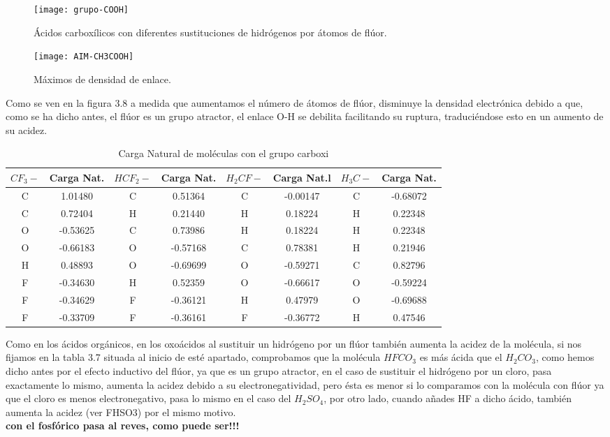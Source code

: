 \begin{figure}[H]
	\centering
	\texttt{[image: grupo-COOH]}
	\caption{Ácidos carboxílicos con diferentes sustituciones de hidrógenos por átomos de flúor.}
\end{figure}
\begin{figure}[H]
\centering
\texttt{[image: AIM-CH3COOH]}\cite{AIM}
\caption{Máximos de densidad de enlace.}
\end{figure}

Como se ven en la figura 3.8 a medida que aumentamos el número de átomos de flúor, disminuye la densidad electrónica debido a que, como se ha dicho antes, el flúor es un grupo atractor, el enlace O-H se debilita facilitando su ruptura, traduciéndose esto en un aumento de su acidez.
\begin{table}[H]
    \centering
    \begin{tabular}{|c|c|c|c|c|c|c|c|}
    \hline
    $CF_3-$ & Carga Nat. & $HCF_2-$ & Carga Nat. & $H_2CF-$ & Carga Nat.l  & $H_3C-$ & Carga Nat. \\ \hline
     C & 1.01480 &  C & 0.51364 & C & -0.00147 & C & -0.68072 \\ \hline
     C & 0.72404 &  H & 0.21440 & H & 0.18224 & H & 0.22348 \\ \hline
     O & -0.53625 & C & 0.73986 & H & 0.18224 & H & 0.22348 \\ \hline
     O & -0.66183 & O & -0.57168 & C & 0.78381 & H & 0.21946 \\ \hline
     H & 0.48893 & O & -0.69699 & O & -0.59271 & C & 0.82796 \\ \hline
     F & -0.34630 & H & 0.52359 & O & -0.66617 & O & -0.59224 \\ \hline
     F & -0.34629 & F & -0.36121 & H & 0.47979 & O & -0.69688 \\ \hline
     F & -0.33709 & F & -0.36161 & F & -0.36772 & H & 0.47546 \\ \hline
    \end{tabular}
    \caption{Carga Natural de moléculas con el grupo carboxi}
\end{table}

Como en los ácidos orgánicos, en los oxoácidos al sustituir un hidrógeno por un flúor también aumenta la acidez de la molécula, si nos fijamos en la tabla 3.7 situada al inicio de esté apartado, comprobamos que la molécula $HFCO_3$ es más ácida que el $H_2CO_3$, como hemos dicho antes por el efecto inductivo del flúor, ya que es un grupo atractor, en el caso de sustituir el hidrógeno por un cloro, pasa exactamente lo mismo, aumenta la acidez debido a su electronegatividad, pero ésta es menor si lo comparamos con la molécula con flúor ya que el cloro es menos electronegativo, pasa lo mismo en el caso del $H_2SO_4$, por otro lado, cuando añades HF a dicho ácido, también aumenta la acidez (ver FHSO3) por el mismo motivo.\\
{\bfseries con el fosfórico pasa al reves, como puede ser!!! }


